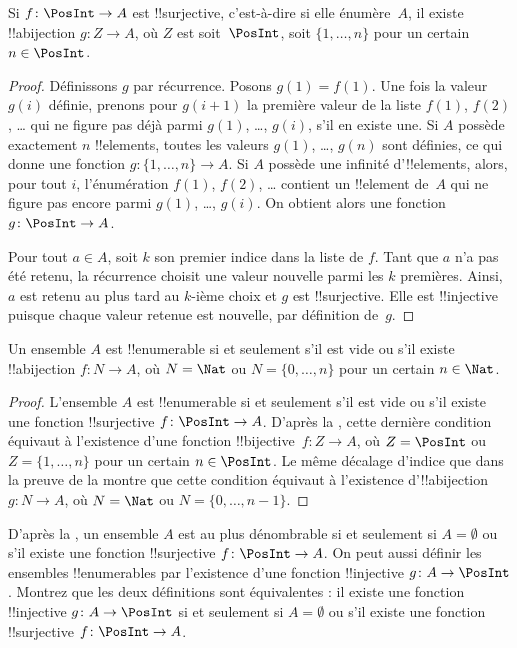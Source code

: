 \documentclass[../../../include/open-logic-section]{subfiles}
\begin{document}
\begin{prop}
Si $f\colon \PosInt \to A$ est !!{surjective}, c’est-à-dire si elle
énumère~$A$, il existe !!a{bijection} $g\colon Z \to A$, où $Z$ est
soit~$\PosInt$, soit $\{1, \dots, n\}$ pour un certain~$n \in \PosInt$.
\end{prop}

\begin{proof}
Définissons $g$ par récurrence. Posons $g(1) = f(1)$. Une fois la valeur
$g(i)$ définie, prenons pour $g(i+1)$ la première valeur de la liste $f(1)$,
$f(2)$, \dots{} qui ne figure pas déjà parmi $g(1)$, \dots, $g(i)$,
s’il en existe une. Si $A$ possède exactement $n$ !!{element}s,
toutes les valeurs $g(1)$, \dots, $g(n)$ sont définies, ce qui donne
une fonction $g\colon \{1, \dots, n\} \to A$. Si $A$ possède une
infinité d’!!{element}s, alors, pour tout $i$, l’énumération $f(1)$,
$f(2)$, \dots{} contient un !!{element} de~$A$ qui ne figure pas encore
parmi $g(1)$, \dots, $g(i)$. On obtient alors une fonction
$g\colon \PosInt \to A$.

Pour tout $a \in A$, soit $k$ son premier indice dans la liste de $f$.
Tant que $a$ n’a pas été retenu, la récurrence choisit une valeur
nouvelle parmi les $k$ premières. Ainsi, $a$ est retenu au plus tard
au $k$-ième choix et $g$ est !!{surjective}. Elle est !!{injective}
puisque chaque valeur retenue est nouvelle, par définition de~$g$.
\end{proof}

\begin{cor}
Un ensemble $A$ est !!{enumerable} si et seulement s’il est vide
ou s’il existe !!a{bijection} $f\colon N \to A$, où $N = \Nat$
ou $N = \{0, \dots, n\}$ pour un certain $n \in \Nat$.
\end{cor}

\begin{proof}
L’ensemble $A$ est !!{enumerable} si et seulement s’il est vide
ou s’il existe une fonction !!{surjective} $f\colon \PosInt \to A$.
D’après la , cette dernière condition équivaut
à l’existence d’une fonction !!{bijective}~$f\colon Z \to A$, où
$Z = \PosInt$ ou $Z = \{1, \dots, n\}$ pour un certain $n \in \PosInt$.
Le même décalage d’indice que dans la preuve de la 
montre que cette condition équivaut à l’existence d’!!a{bijection}
$g\colon N \to A$, où $N = \Nat$ ou $N = \{0, \dots, n-1\}$.
\end{proof}

\begin{prob}
D’après la , un ensemble $A$
est au plus dénombrable si et seulement si $A = \emptyset$ ou s’il
existe une fonction !!{surjective} $f\colon \PosInt \to A$.
On peut aussi définir les ensembles !!{enumerable}s par l’existence
d’une fonction !!{injective} $g\colon A \to \PosInt$. Montrez que
les deux définitions sont équivalentes : il existe une fonction
!!{injective} $g\colon A \to \PosInt$ si et seulement si $A = \emptyset$
ou s’il existe une fonction !!{surjective} $f\colon \PosInt \to A$.
\end{prob}
\end{document}

